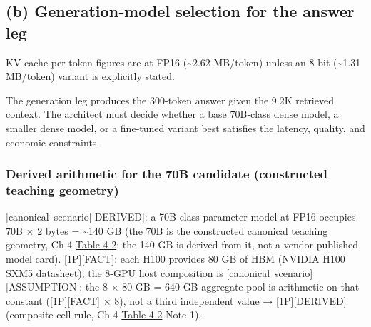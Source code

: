 \subsection{(b) Generation‑model selection for the answer
leg}\label{b-generationmodel-selection-for-the-answer-leg}

KV cache per-token figures are at FP16 (\textasciitilde2.62 MB/token)
unless an 8-bit (\textasciitilde1.31 MB/token) variant is explicitly
stated.

The generation leg produces the 300-token answer given the 9.2K
retrieved context. The architect must decide whether a base 70B‑class
dense model, a smaller dense model, or a fine‑tuned variant best
satisfies the latency, quality, and economic constraints.

\subsubsection{Derived arithmetic for the 70B candidate (constructed
teaching
geometry)}\label{derived-arithmetic-for-the-70b-candidate-constructed-teaching-geometry}

\mbox{{[}canonical scenario{]}}\hspace{0pt}\mbox{{[}DERIVED{]}}: a 70B-class parameter model at
FP16 occupies 70B × 2 bytes = \textasciitilde140 GB (the 70B is the
constructed canonical teaching geometry, Ch 4 \hyperref[tab:4.2]{Table 4-2}; the 140 GB is
derived from it, not a vendor-published model card). \mbox{{[}1P{]}}\hspace{0pt}\mbox{{[}FACT{]}}:
each H100 provides 80 GB of HBM (NVIDIA H100 SXM5 datasheet); the 8-GPU
host composition is \mbox{{[}canonical scenario{]}}\hspace{0pt}\mbox{{[}ASSUMPTION{]}}; the 8 × 80
GB = 640 GB aggregate pool is arithmetic on that constant
(\mbox{{[}1P{]}}\hspace{0pt}\mbox{{[}FACT{]}} × 8), not a third independent value →
\mbox{{[}1P{]}}\hspace{0pt}\mbox{{[}DERIVED{]}} (composite-cell rule, Ch 4 \hyperref[tab:4.2]{Table 4-2} Note 1).

